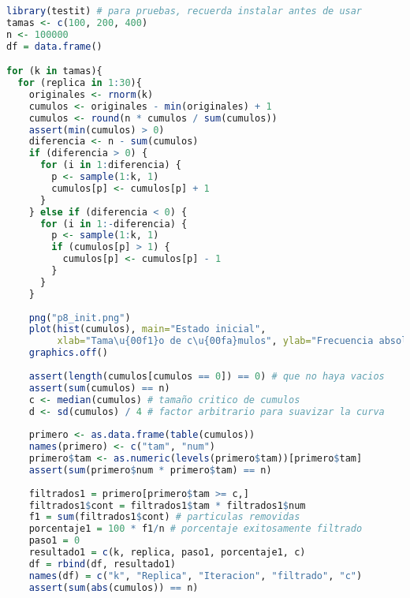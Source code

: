 \documentclass{article}
\begin{document}
\lstset{style=mystyle}
\begin{lstlisting}[language=R, caption= Código para graficar el porcentaje de filtrado en cada iteración.]
library(testit) # para pruebas, recuerda instalar antes de usar
tamas <- c(100, 200, 400)
n <- 100000
df = data.frame()

for (k in tamas){
  for (replica in 1:30){
    originales <- rnorm(k)
    cumulos <- originales - min(originales) + 1
    cumulos <- round(n * cumulos / sum(cumulos))
    assert(min(cumulos) > 0)
    diferencia <- n - sum(cumulos)
    if (diferencia > 0) {
      for (i in 1:diferencia) {
        p <- sample(1:k, 1)
        cumulos[p] <- cumulos[p] + 1
      }
    } else if (diferencia < 0) {
      for (i in 1:-diferencia) {
        p <- sample(1:k, 1)
        if (cumulos[p] > 1) {
          cumulos[p] <- cumulos[p] - 1
        }
      }
    }
    
    png("p8_init.png")
    plot(hist(cumulos), main="Estado inicial",
         xlab="Tama\u{00f1}o de c\u{00fa}mulos", ylab="Frecuencia absoluta")
    graphics.off()
    
    assert(length(cumulos[cumulos == 0]) == 0) # que no haya vacios
    assert(sum(cumulos) == n)
    c <- median(cumulos) # tamaño critico de cumulos
    d <- sd(cumulos) / 4 # factor arbitrario para suavizar la curva
    
    primero <- as.data.frame(table(cumulos))
    names(primero) <- c("tam", "num")
    primero$tam <- as.numeric(levels(primero$tam))[primero$tam]
    assert(sum(primero$num * primero$tam) == n)
    
    filtrados1 = primero[primero$tam >= c,]
    filtrados1$cont = filtrados1$tam * filtrados1$num
    f1 = sum(filtrados1$cont) # particulas removidas
    porcentaje1 = 100 * f1/n # porcentaje exitosamente filtrado
    paso1 = 0
    resultado1 = c(k, replica, paso1, porcentaje1, c)
    df = rbind(df, resultado1)
    names(df) = c("k", "Replica", "Iteracion", "filtrado", "c")
    assert(sum(abs(cumulos)) == n)
    

\end{lstlisting}
\end{document}
